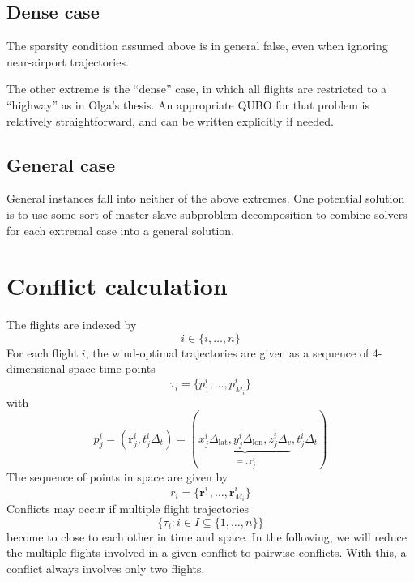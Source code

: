 \documentclass{article}
\begin{document}
\subsection{Dense case}
The sparsity condition assumed above is in general false, even when ignoring near-airport trajectories.

The other extreme is the ``dense'' case, in which all flights are restricted to a ``highway'' as in Olga's thesis.
An appropriate QUBO for that problem is relatively straightforward, and can be written explicitly if needed.

\subsection{General case}
General instances fall into neither of the above extremes.
One potential solution is to use some sort of master-slave subproblem decomposition to combine solvers for each extremal case into a general solution.

\section{Conflict calculation}
The flights are indexed by
\begin{equation*}
    i \in \{i, \dots, n\}
\end{equation*}
For each flight $i$, the wind-optimal trajectories are given as a sequence of 4-dimensional space-time points
\begin{equation*}
    \tau_i = \{p^i_1, \dots, p^i_{M_i}\}
\end{equation*}
with
\begin{equation*}
    p^i_j = (\mathbf{r}^i_j, t^i_j \Delta_t) = \left( \underbrace{x^i_j \Delta_\text{lat}, y^i_j \Delta_\text{lon}, z^i_j \Delta_v}_{=:\mathbf{r}^i_j}, t^i_j \Delta_t\right)
\end{equation*}
The sequence of points in space are given by
\begin{equation*}
    r_i = \{\mathbf{r}^i_1, \dots, \mathbf{r}^i_{M_i}\}
\end{equation*}
Conflicts may occur if multiple flight trajectories
\begin{equation*}
    \{\tau_i : i \in I \subseteq \{1, \dots, n\}\}
\end{equation*}
become to close to each other in time and space.
In the following, we will reduce the multiple flights involved in a given conflict to pairwise conflicts.
With this, a conflict always involves only two flights.
\end{document}
